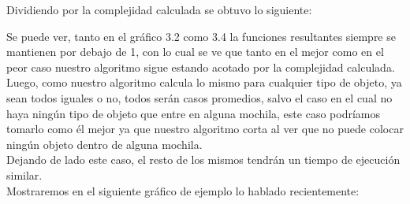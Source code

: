 Dividiendo por la complejidad calculada se obtuvo lo siguiente:\\

\vspace*{0.3cm} \vspace*{0.3cm}
  \begin{center}
  \end{center}
  \vspace*{0.3cm}
  

Se puede ver, tanto en el gr\'afico 3.2 como 3.4 la funciones resultantes siempre se mantienen por debajo de 1, con lo cual se ve que tanto en el mejor como en el peor caso nuestro algoritmo sigue estando acotado por la complejidad calculada.\\

Luego, como nuestro algoritmo calcula lo mismo para cualquier tipo de objeto, ya sean todos iguales o no, todos ser\'an casos promedios, salvo el caso en el cual no haya ning\'un tipo de objeto que entre en alguna mochila, este caso podr\'iamos tomarlo como \'el mejor ya que nuestro algoritmo corta al ver que no puede colocar ning\'un objeto dentro de alguna mochila.\\
Dejando de lado este caso, el resto de los mismos tendr\'an un tiempo de ejecuci\'on similar.\\

Mostraremos en el siguiente gr\'afico de ejemplo lo hablado recientemente:\\

\vspace*{0.3cm} \vspace*{0.3cm}
  \begin{center}
  \end{center}
  \vspace*{0.3cm}